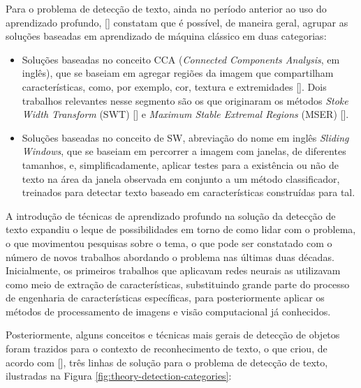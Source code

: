 Para o problema de detecção de texto, ainda no período anterior ao uso do aprendizado profundo, [] constatam que é 
possível, de maneira geral, agrupar as soluções baseadas em aprendizado de máquina clássico em duas categorias:

\begin{itemize}
    \item Soluções baseadas no conceito CCA (\textit{Connected Components Analysis}, em inglês), que se baseiam em agregar regiões da imagem que 
    compartilham características, como, por exemplo, cor, textura e extremidades []. Dois trabalhos relevantes 
    nesse segmento são os que originaram os métodos \textit{Stoke Width Transform} (SWT) [] e \textit{Maximum Stable Extremal Regions} 
    (MSER) [].

    \item Soluções baseadas no conceito de SW, abreviação do nome em inglês \textit{Sliding Windows}, que se baseiam em percorrer a imagem com janelas, 
    de diferentes tamanhos, e, simplificadamente, aplicar testes para a existência ou não de texto na área da janela observada em conjunto a um método 
    classificador, treinados para detectar texto baseado em características construídas para tal.
\end{itemize}

A introdução de técnicas de aprendizado profundo na solução da detecção de texto expandiu o leque de possibilidades em torno de como lidar com o problema, 
o que movimentou pesquisas sobre o tema, o que pode ser constatado com o número de novos trabalhos abordando o problema nas últimas duas décadas.
Inicialmente, os primeiros trabalhos que aplicavam redes neurais as utilizavam como meio de extração de características, substituindo grande parte do 
processo de engenharia de características específicas, para posteriormente aplicar os métodos de processamento de imagens e visão computacional já conhecidos.

Posteriormente, alguns conceitos e técnicas mais gerais de detecção de objetos foram trazidos para o contexto de reconhecimento de texto, o que criou, 
de acordo com [], três linhas de solução para o problema de detecção de texto, ilustradas na Figura \ref{fig:theory-detection-categories}:

